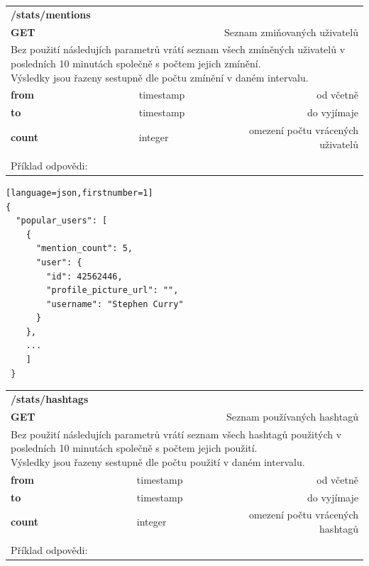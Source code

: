 \documentclass[thesis=B,czech]{FITthesis}[2012/06/26]
\begin{document}
\begin{table}[h]
\begin{tabular}{llllr}
\rowcolor[HTML]{EFEFEF}
\large \textbf{/stats/mentions}        &         &                 &        & \multicolumn{1}{l}{}                \\
\rowcolor[HTML]{EFEFEF}
\textbf{GET}          &         &                 &        & Seznam zmiňovaných uživatelů                        \\
\multicolumn{5}{l}{\parbox[t]{12.8cm}{Bez použití následujích parametrů vrátí seznam všech zmíněných uživatelů v posledních 10 minutách společně s počtem jejich zmínění. \\ Výsledky jsou řazeny sestupně dle počtu zmínění v daném intervalu. }  } \\
\textbf{from}         &         & timestamp       &        & od včetně                           \\
\textbf{to}           &         & timestamp       &        & do vyjímaje                         \\
\textbf{count}        &         & integer         &        & omezení počtu vrácených uživatelů     \\ 
 & & & & \\
 Příklad odpovědi:
\end{tabular}
\end{table}

\begin{lstlisting}[float=H][language=json,firstnumber=1]
{
  "popular_users": [
    {
      "mention_count": 5,
      "user": {
        "id": 42562446,
        "profile_picture_url": "",
        "username": "Stephen Curry"
      }
    },
    ...
    ]
 }
\end{lstlisting} 

\begin{table}[h]
\begin{tabular}{llllr}
\rowcolor[HTML]{EFEFEF}
\large \textbf{/stats/hashtags}        &         &                 &        & \multicolumn{1}{l}{}                \\
\rowcolor[HTML]{EFEFEF}
\textbf{GET}          &         &                 &        & Seznam používaných hashtagů                        \\
\multicolumn{5}{l}{\parbox[t]{12.8cm}{Bez použití následujích parametrů vrátí seznam všech hashtagů použitých v posledních 10 minutách společně s počtem jejich použití. \\ Výsledky jsou řazeny sestupně dle počtu použití v daném intervalu. }  } \\
\textbf{from}         &         & timestamp       &        & od včetně                           \\
\textbf{to}           &         & timestamp       &        & do vyjímaje                         \\
\textbf{count}        &         & integer         &        & omezení počtu vrácených hashtagů     \\
 & & & & \\
 Příklad odpovědi: 
\end{tabular}
\end{table}
\end{document}
